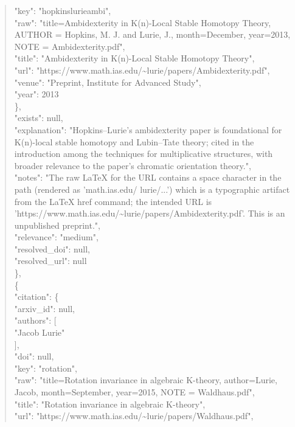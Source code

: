 \documentclass[11pt]{article}
\begin{document}
\begin{quote}
        "key": "hopkinslurieambi",\\
        "raw": "title=Ambidexterity in K(n)-Local Stable Homotopy Theory, AUTHOR = Hopkins, M. J. and Lurie, J., month=December, year=2013, NOTE = Ambidexterity.pdf",\\
        "title": "Ambidexterity in K(n)-Local Stable Homotopy Theory",\\
        "url": "https://www.math.ias.edu/\~{}lurie/papers/Ambidexterity.pdf",\\
        "venue": "Preprint, Institute for Advanced Study",\\
        "year": 2013\\
      \},\\
      "exists": null,\\
      "explanation": "Hopkins--Lurie's ambidexterity paper is foundational for K(n)-local stable homotopy and Lubin--Tate theory; cited in the introduction among the techniques for multiplicative structures, with broader relevance to the paper's chromatic orientation theory.",\\
      "notes": "The raw LaTeX for the URL contains a space character in the path (rendered as 'math.ias.edu/ lurie/...') which is a typographic artifact from the LaTeX href command; the intended URL is 'https://www.math.ias.edu/\~{}lurie/papers/Ambidexterity.pdf'. This is an unpublished preprint.",\\
      "relevance": "medium",\\
      "resolved\_doi": null,\\
      "resolved\_url": null\\
    \},\\
    \{\\
      "citation": \{\\
        "arxiv\_id": null,\\
        "authors": [\\
          "Jacob Lurie"\\
        ],\\
        "doi": null,\\
        "key": "rotation",\\
        "raw": "title=Rotation invariance in algebraic K-theory, author=Lurie, Jacob, month=September, year=2015, NOTE = Waldhaus.pdf",\\
        "title": "Rotation invariance in algebraic K-theory",\\
        "url": "https://www.math.ias.edu/\~{}lurie/papers/Waldhaus.pdf",\\

\end{quote}
\end{document}
